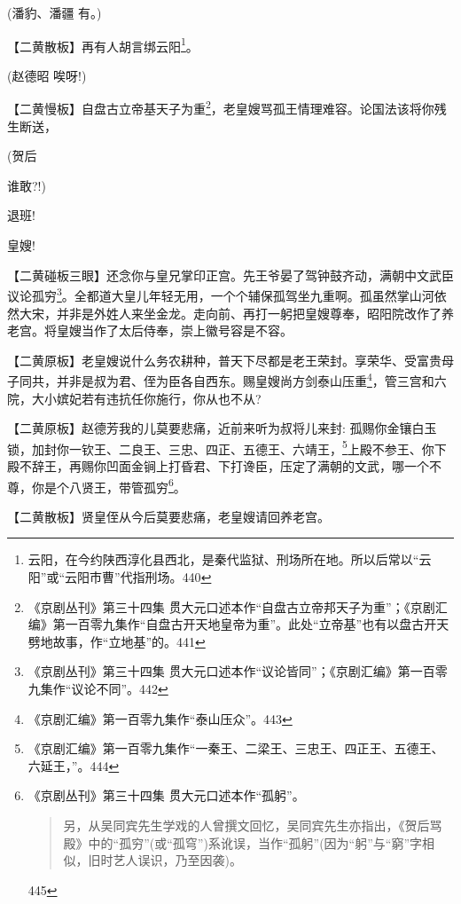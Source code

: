 {(潘豹、潘疆 有。)}

\setlength{\hangindent}{60pt} {【{\akai 二黄散板}】再有人胡言绑云阳}\footnote{ 云阳，在今约陕西淳化县西北，是秦代监狱、刑场所在地。所以后常以``云阳''或``云阳市曹''{代指刑场。}{440}}{。}

{(赵德昭 唉呀!)}

\setlength{\hangindent}{60pt} {【{\akai 二黄慢板}】自盘古立帝基天子为重}\footnote{ {《京剧丛刊》第三十四集  贯大元口述本作``自盘古立帝邦天子为重''；《京剧汇编》第一百零九集作``自盘古开天地皇帝为重''。此处``立帝基''也有以盘古开天劈地故事，作``立地基''的。}{441}}{，老皇嫂骂孤王情理难容。论国法该将你残生断送，}

{(贺后\hspace{30pt}~

谁敢?!)}

{退班!}

{皇嫂!}

\setlength{\hangindent}{60pt} {【{\akai 二黄碰板三眼}】还念你与皇兄掌印正宫。先王爷晏了驾钟鼓齐动，满朝中文武臣议论孤穷}\footnote{ {《京剧丛刊》第三十四集  贯大元口述本作``议论皆同''；《京剧汇编》第一百零九集作``议论不同''。}{442}}{。全都道大皇儿年轻无用，一个个辅保孤驾坐九重啊。孤虽然掌山河依然大宋，并非是外姓人来坐金龙。走向前、再打一躬把皇嫂尊奉，昭阳院改作了养老宫。将皇嫂当作了太后侍奉，崇上徽号容是不容。}

\setlength{\hangindent}{60pt} {【{\akai 二黄原板}】老皇嫂说什么务农耕种，普天下尽都是老王荣封。享荣华、受富贵母子同共，并非是叔为君、侄为臣各自西东。赐皇嫂尚方剑泰山压重}\footnote{ {《京剧汇编》第一百零九集作``泰山压众''。}{443}}{，管三宫和六院，大小嫔妃若有违抗任你施行，你从也不从?}

\setlength{\hangindent}{60pt} {【{\akai 二黄原板}】赵德芳我的儿莫要悲痛，近前来听为叔将儿来封: 孤赐你金镶白玉锁，加封你一钦王、二良王、三忠、四正、五德王、六靖王，}\footnote{ {《京剧汇编》第一百零九集作``一秦王、二梁王、三忠王、四正王、五德王、六延王，''。}{444}}{上殿不参王、你下殿不辞王，再赐你凹面金锏上打昏君、下打谗臣，压定了满朝的文武，哪一个不尊，你是个八贤王，带管孤穷}\footnote{ {《京剧丛刊》第三十四集 贯大元口述本作``孤躬''。}  \begin{quote}  另，从吴同宾先生学戏的人曾撰文回忆，吴同宾先生亦指出，《贺后骂殿》中的``孤穷''(或``孤穹'')系讹误，当作``孤躬''(因为``躬''与``窮''字相似，旧时艺人误识，乃至因袭)。  \end{quote}  {445}}{。}

\setlength{\hangindent}{60pt} {【{\akai 二黄散板}】贤皇侄从今后莫要悲痛，老皇嫂请回养老宫。}

